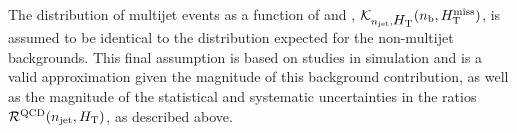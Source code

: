 The distribution of multijet events as a function of \nb and \HTmiss,
$\mathcal{K}_{n_{\text{jet}}, \mbox{$H_\text{T}$}}( n_{\text{b}}, \mbox{$H_{\rm T}^{\rm miss}$} )$, is assumed to be
identical to the distribution expected for the non-multijet
backgrounds. This final assumption is based on studies in simulation
and is a valid approximation given the magnitude of this background
contribution, as well as the magnitude of the statistical and
systematic uncertainties in the ratios
$\mathcal{R}^\mathrm{QCD}(n_{\text{jet}}, \mbox{$H_\text{T}$})$, as described above.






